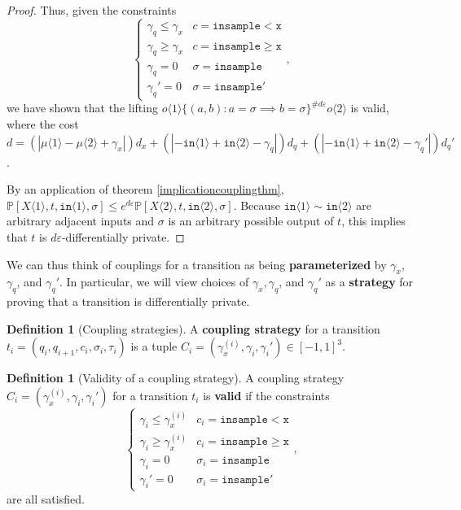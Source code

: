 \documentclass[12pt]{article}
\newcommand{\PP}{\mathbb{P}}
\newcommand{\gguard}[1][x]{\texttt{insample}\geq#1}
\newcommand{\lguard}[1][x]{\texttt{insample} < #1}
\newcommand{\brangle}[1]{\langle#1 \rangle}
\theoremstyle{definition}
\newtheorem{defn}[thm]{Definition}
\begin{document}
\begin{proof}
Thus, given the constraints \[
  \begin{cases}
    \gamma_q\leq\gamma_x & c = \lguard[\texttt{x}]\\
    \gamma_q\geq\gamma_x & c = \gguard[\texttt{x}]\\
    \gamma_q=0 & \sigma = \texttt{insample}\\
    \gamma_q'=0 & \sigma = \texttt{insample}'
  \end{cases},
\]
we have shown that the lifting $o\brangle{1}\{(a, b): a=\sigma\implies b=\sigma\}^{\#d\varepsilon}o\brangle{2}$ is valid, where the cost $d = (|\mu\brangle{1}-\mu\brangle{2}+\gamma_x|)d_x+(|-\texttt{in}\brangle{1}+\texttt{in}\brangle{2}-\gamma_q|)d_q+(|-\texttt{in}\brangle{1}+\texttt{in}\brangle{2}-\gamma_q'|)d_q'$. 

By an application of theorem \ref{implicationcouplingthm}, $\PP[X\brangle{1}, t, \texttt{in}\brangle{1}, \sigma]\leq e^{d\varepsilon}\PP[X\brangle{2}, t, \texttt{in}\brangle{2}, \sigma]$. Because $\texttt{in}\brangle{1}\sim\texttt{in}\brangle{2}$ are arbitrary adjacent inputs and $\sigma$ is an arbitrary possible output of $t$, this implies that $t$ is $d\varepsilon$-differentially private. 
\end{proof}

We can thus think of couplings for a transition as being \textbf{parameterized} by $\gamma_x$, $\gamma_q$, and $\gamma_q'$. In particular, we will view choices of $\gamma_x, \gamma_q$, and $\gamma_q'$ as a \textbf{strategy} for proving that a transition is differentially private. 

\begin{defn}[Coupling strategies]
    A \textbf{coupling strategy} for a transition $t_i = (q_i, q_{i+1}, c_i, \sigma_i, \tau_i)$ is a tuple $C_i = (\gamma_x^{(i)}, \gamma_i, \gamma_i')\in [-1, 1]^3$. 
\end{defn}

\begin{defn}[Validity of a coupling strategy]
    A coupling strategy $C_i =(\gamma_x^{(i)}, \gamma_i, \gamma_i')$ for a transition $t_i$ is \textbf{valid} if the constraints \[
        \begin{cases}
          \gamma_i\leq\gamma_x^{(i)} & c_i = \lguard[\texttt{x}]\\
          \gamma_i\geq\gamma_x^{(i)} & c_i = \gguard[\texttt{x}]\\
          \gamma_i=0 & \sigma_i = \texttt{insample}\\
          \gamma_i'=0 & \sigma_i = \texttt{insample}'
        \end{cases},
      \]
      are all satisfied. 
\end{defn}
\end{document}

